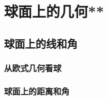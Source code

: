 \chapter{球面上的几何**}

\section{球面上的线和角}
\subsection{从欧式几何看球}
\clearpage
\subsection{球面上的距离和角}

\clearpage
